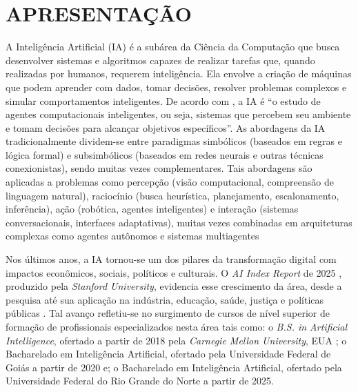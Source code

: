 \chapter{APRESENTAÇÃO}
\label{cap:apresentacao}

A Inteligência Artificial (IA) é a subárea da Ciência da Computação que busca desenvolver sistemas e algoritmos capazes de realizar tarefas que, quando realizadas por humanos, requerem inteligência. Ela envolve a criação de máquinas que podem aprender com dados, tomar decisões, resolver problemas complexos e simular comportamentos inteligentes. De acordo com , a IA é ``o estudo de agentes computacionais inteligentes, ou seja, sistemas que percebem seu ambiente e tomam decisões para alcançar objetivos específicos''. As abordagens da IA tradicionalmente dividem-se entre paradigmas simbólicos (baseados em regras e lógica formal) e subsimbólicos (baseados em redes neurais e outras técnicas conexionistas), sendo muitas vezes complementares. Tais abordagens são aplicadas a problemas como percepção (visão computacional, compreensão de linguagem natural), raciocínio (busca heurística, planejamento, escalonamento, inferência), ação (robótica, agentes inteligentes) e interação (sistemas conversacionais, interfaces adaptativas), muitas vezes combinadas em arquiteturas complexas como  agentes autônomos e sistemas multiagentes \cite{russell2022ia, poole2017ai} 

Nos últimos anos, a IA tornou-se um dos pilares da transformação digital com impactos econômicos, sociais, políticos e culturais. O \textit{AI Index Report} de 2025 \cite{aiindex2025}, produzido pela \textit{Stanford University}, evidencia esse crescimento da área, desde a pesquisa até sua aplicação na indústria, educação, saúde, justiça e políticas públicas \cite{russell2022ia}. Tal avanço refletiu-se no surgimento de cursos de nível superior de formação de profissionais especializados nesta área tais como: o \textit{B.S. in Artificial Intelligence}, ofertado a partir de 2018 pela \textit{Carnegie Mellon University}, EUA \cite{cmu_bsai}; o Bacharelado em Inteligência Artificial, ofertado pela Universidade Federal de Goiás \cite{ufg_bia} a partir de 2020 e; o Bacharelado em Inteligência Artificial, ofertado pela Universidade Federal do Rio Grande do Norte \cite{ufrn_bia} a partir de 2025. 



